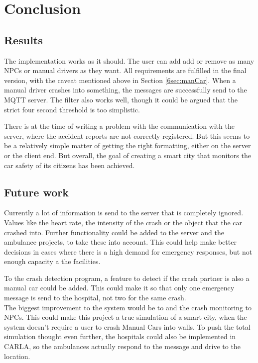 
\section{Conclusion}

\subsection{Results}\label{6sec:Results}

The implementation works as it should.
The user can add add or remove as many NPCs or manual drivers as they want.
All requirements are fulfilled in the final version,
with the caveat mentioned above in Section \ref{6sec:manCar}.
When a manual driver crashes into something, 
the messages are successfully send to the MQTT server.
The filter also works well, 
though it could be argued that the strict four 
second threshold is too simplistic.

\noindent 
There is at the time of writing a problem with the communication with the server,
where the accident reports are not correctly registered.
But this seems to be a relatively simple matter 
of getting the right formatting,
either on the server or the client end.
But overall, the goal of creating a smart city 
that monitors the car safety of its citizens has been achieved.

\subsection{Future work}\label{6sec:future Work}

Currently a lot of information is send to the server that is completely ignored.
Values like the heart rate, the intensity of the crash
or the object that the car crashed into.
Further functionality could be added to the server and
the ambulance projects, to take these into account.
This could help make better decisions in cases 
where there is a high demand for emergency responses,
but not enough capacity a the facilities.

To the crash detection program, a feature to detect if the crash partner is also 
a manual car could be added.
This could make it so that only one emergency message is send to the hospital,
not two for the same crash.
\\
\newline
The biggest improvement to the system  would be to and the crash monitoring to NPCs.
This could make this project a true simulation of a smart city,
when the system doesn't require a user to crash Manual Cars into walls.
To push the total simulation thought even further,
the hospitals could also be implemented in CARLA,
so the ambulances actually respond to the message and drive to the location.